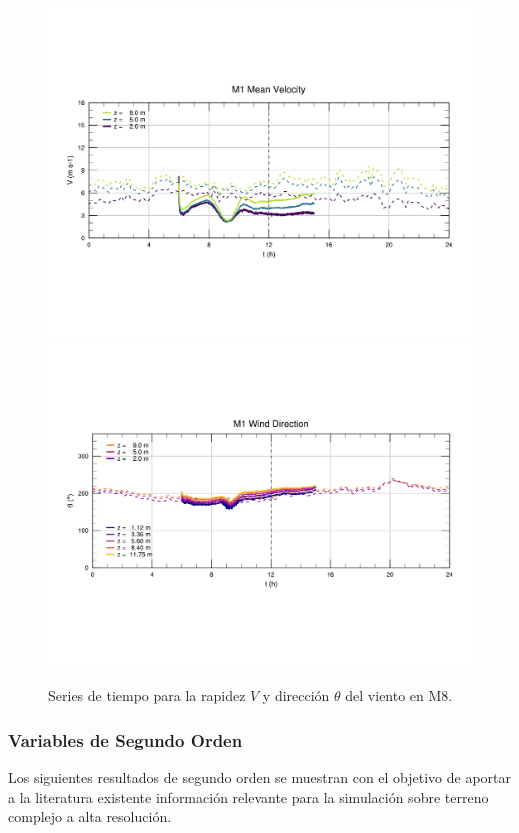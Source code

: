 \begin{figure}[H]
	\centering
	\includegraphics[width=0.87\linewidth,page=8,trim={9mm 57mm 10mm 60mm},clip]{Imagenes/06/bol/ts_interpol_compare.pdf}\\%
	\includegraphics[width=0.87\linewidth,page=8,trim={12mm 52mm 10mm 60mm},clip]{Imagenes/06/bol/ts_interpol_compare_o.pdf}%
	\vspace{-2mm}\caption{Series de tiempo para la rapidez $V$ y dirección $\theta$ del viento en M8.}
	\label{fig:06_bol_ts_m8}
\end{figure}
\subsubsection{Variables de Segundo Orden}
Los siguientes resultados de segundo orden se muestran con el objetivo de aportar a la literatura existente información relevante para la simulación sobre terreno complejo a alta resolución.


